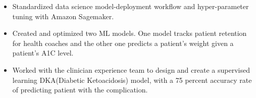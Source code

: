 \documentclass[10pt,a4paper,ragged2e,withhyper]{altacv}
\begin{document}
\begin{paracol}{2}
  \begin{itemize}
    \item Standardized data science model-deployment workflow and hyper-parameter tuning with Amazon Sagemaker.
    \item Created and optimized two ML models. One model tracks patient retention for health coaches and the other one predicts a patient’s weight given a patient’s A1C level.
    \item Worked with the clinician experience team to design and create a supervised learning DKA(Diabetic Ketoacidosis) model, with a 75 percent accuracy rate of predicting patient with the complication.
  \end{itemize}
\end{paracol}
\end{document}
